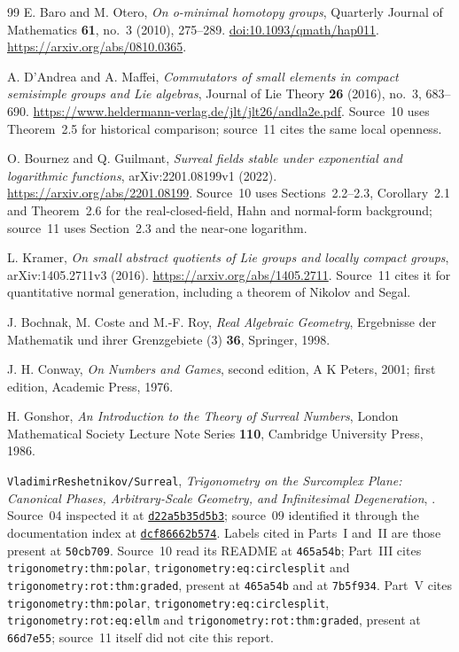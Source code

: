 \documentclass[11pt,letterpaper]{article}
\numberwithin{equation}{section}
\theoremstyle{definition}
\theoremstyle{remark}
\newcommand{\repo}{\texttt{VladimirReshetnikov/Surreal}}
\begin{document}
\begin{thebibliography}{99}
E. Baro and M. Otero,
\emph{On o-minimal homotopy groups},
Quarterly Journal of Mathematics \textbf{61}, no.~3 (2010), 275--289.
\href{https://doi.org/10.1093/qmath/hap011}{doi:10.1093/qmath/hap011}.
\url{https://arxiv.org/abs/0810.0365}.

A. D'Andrea and A. Maffei,
\emph{Commutators of small elements in compact semisimple groups and Lie
algebras},
Journal of Lie Theory \textbf{26} (2016), no.~3, 683--690.
\url{https://www.heldermann-verlag.de/jlt/jlt26/andla2e.pdf}.
Source~10 uses Theorem~2.5 for historical comparison; source~11 cites the same
local openness.

O. Bournez and Q. Guilmant,
\emph{Surreal fields stable under exponential and logarithmic functions},
arXiv:2201.08199v1 (2022).
\url{https://arxiv.org/abs/2201.08199}.
Source~10 uses Sections~2.2--2.3, Corollary~2.1 and Theorem~2.6 for the
real-closed-field, Hahn and normal-form background; source~11 uses Section~2.3
and the near-one logarithm.

L. Kramer,
\emph{On small abstract quotients of Lie groups and locally compact groups},
arXiv:1405.2711v3 (2016).
\url{https://arxiv.org/abs/1405.2711}.
Source~11 cites it for quantitative normal generation, including a theorem of
Nikolov and Segal.

J. Bochnak, M. Coste and M.-F. Roy,
\emph{Real Algebraic Geometry},
Ergebnisse der Mathematik und ihrer Grenzgebiete (3) \textbf{36},
Springer, 1998.

J. H. Conway,
\emph{On Numbers and Games}, second edition,
A K Peters, 2001; first edition, Academic Press, 1976.

H. Gonshor,
\emph{An Introduction to the Theory of Surreal Numbers},
London Mathematical Society Lecture Note Series \textbf{110},
Cambridge University Press, 1986.

\repo,
\emph{Trigonometry on the Surcomplex Plane: Canonical Phases,
Arbitrary-Scale Geometry, and Infinitesimal Degeneration},
.
Source~04 inspected it at
\href{https://github.com/VladimirReshetnikov/Surreal/blob/d22a5b35d5b3040e870c3cfd6d1c8f7259e094b0/docs/surcomplex/trigonometry/article.tex}{\texttt{d22a5b35d5b3}};
source~09 identified it through the documentation index at
\href{https://github.com/VladimirReshetnikov/Surreal/tree/dcf86662b574988e75d08d515d3a2a5ba7bbc0d7/docs/surcomplex/trigonometry}{\texttt{dcf86662b574}}.
Labels cited in Parts~I and~II are those present at \texttt{50cb709}.
Source~10 read its README at \texttt{465a54b}; Part~III cites
\texttt{trigonometry:thm:polar}, \texttt{trigonometry:eq:circlesplit} and
\texttt{trigonometry:rot:thm:graded}, present at \texttt{465a54b} and at
\texttt{7b5f934}. Part~V cites \texttt{trigonometry:thm:polar},
\texttt{trigonometry:eq:circlesplit}, \texttt{trigonometry:rot:eq:ellm} and
\texttt{trigonometry:rot:thm:graded}, present at \texttt{66d7e55}; source~11
itself did not cite this report.


\end{thebibliography}
\end{document}
